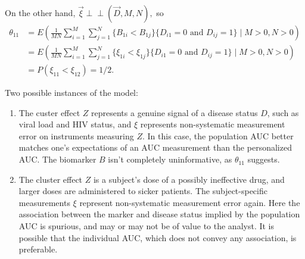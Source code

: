 \documentclass[12pt]{article}
\DeclareMathOperator{\AUC}{AUC}
\newcommand{\E}{E}
\renewcommand{\P}{P}
\newcommand{\cind}{\perp \!\!\! \perp}
\newcommand{\aucindiv}{\theta_{11}}%
\begin{document}
On the other hand, $\vec{\xi}\cind (\vec{D},M,N),$ so 
\begin{align}
  \aucindiv &= \E\left(\frac{1}{MN}\sum_{i=1}^M\sum_{j=1}^N \{B_{1i}<B_{1j}\}\{D_{i1}=0\text{ and }D_{ij}=1\}\mid M>0,N>0\right)\\
  &= \E\left(\frac{1}{MN}\sum_{i=1}^M\sum_{j=1}^N \{\xi_{1i}<\xi_{1j}\}\{D_{i1}=0\text{ and }D_{ij}=1\}\mid M>0,N>0\right)\\
  &=\P(\xi_{11}<\xi_{12})=1/2.
\end{align}

Two possible instances of the model:
\begin{enumerate}[label=(\alph*)]
\item The custer effect $Z$ represents a genuine signal of a disease
status $D$, such as viral load and HIV status, and $\xi$ represents
non-systematic measurement error on instruments measuring $Z$. In this
case, the population AUC better matches one's expectations of an AUC
measurement than the personalized AUC. The biomarker $B$ isn't
completely uninformative, as $\aucindiv$ suggests.
\item \label{item:example:threshold model:spurious} The cluster effect $Z$ is a subject's dose of a possibly ineffective drug,
and larger doses are administered to sicker patients. The subject-specific
measurements $\xi$ represent non-systematic measurement error
again. Here the association between the marker and disease status
implied by the population AUC is spurious, and may or may not be of
value to the analyst. It is possible that the individual AUC, which
does not convey any association, is preferable.
\end{enumerate}
\end{document}
